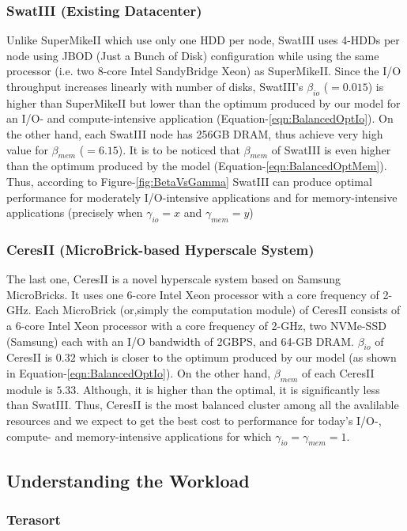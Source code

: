 \documentclass[journal]{IEEEtran}
\begin{document}
\subsubsection{SwatIII (Existing Datacenter)}
Unlike SuperMikeII which use only one HDD per node, SwatIII uses 4-HDDs per node using JBOD (Just a Bunch of Disk) conﬁguration while using the same processor (i.e. two 8-core Intel SandyBridge Xeon) as SuperMikeII. Since the I/O throughput increases linearly with number of disks, SwatIII's $\beta_{io}$ ($=0.015$) is higher than SuperMikeII but lower than the optimum produced by our model for an I/O- and compute-intensive application (Equation-\ref{eqn:BalancedOptIo}). On the other hand, each SwatIII node has 256GB DRAM, thus achieve very high value for $\beta_{mem}$ ($=6.15$). It is to be noticed that $\beta_{mem}$ of SwatIII is even higher than the optimum produced by the model (Equation-\ref{eqn:BalancedOptMem}). Thus, according to Figure-\ref{fig:BetaVsGamma} SwatIII can produce optimal performance for moderately I/O-intensive applications and for memory-intensive applications (precisely when $\gamma_{io} = x$ and $\gamma_{mem}=y$)
\subsubsection{CeresII (MicroBrick-based Hyperscale System)}
The last one, CeresII is a novel hyperscale system based on Samsung MicroBricks. It uses one 6-core Intel Xeon processor with a core frequency of 2-GHz. Each MicroBrick (or,simply the computation module) of CeresII consists of a 6-core Intel Xeon processor with a core frequency of 2-GHz, two NVMe-SSD (Samsung) each with an I/O bandwidth of 2GBPS, and 64-GB DRAM. $\beta
_{io}$ of CeresII is $0.32$ which is closer to the optimum produced by our model (as shown in Equation-\ref{eqn:BalancedOptIo}).  On the other hand, $\beta_{mem}$ of each CeresII module is $5.33$. Although, it is higher than the optimal, it is significantly less than SwatIII. Thus, CeresII is the most balanced cluster among all the avalilable resources and we expect to get the best cost to performance for today's I/O-, compute- and memory-intensive applications for which  $\gamma_{io} = \gamma_{mem} = 1$. 
 
\subsection{Understanding the Workload}
\subsubsection{Terasort}
\end{document}
